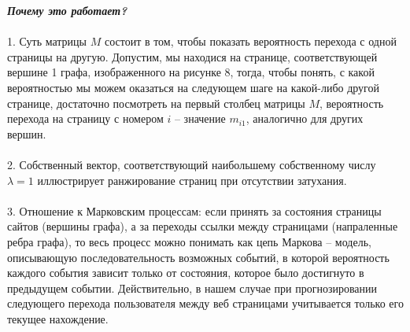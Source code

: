 \documentclass[a5paper, 10pt]{article}
\theoremstyle{definition}
\theoremstyle{plain}
\theoremstyle{remark}
\begin{document}
\newpage
\textbf{\textit{Почему это работает?}}\\
\\
1. Суть матрицы $M$ состоит в том, чтобы показать вероятность перехода с одной страницы на другую. Допустим, мы находися на странице, соответствующей вершине 1 графа, изображенного на рисунке 8, тогда, чтобы понять, с какой вероятностью мы можем оказаться на следующем шаге на какой-либо другой странице, достаточно посмотреть на первый столбец матрицы $M$, вероятность перехода на страницу с номером $i$ -- значение $m_{i1}$, аналогично для других вершин.\\
\\
2. Собственный вектор, соответствующий наибольшему собственному числу $\lambda = 1$ иллюстрирует ранжирование страниц при отсутствии затухания.
\\
\\
3. Отношение к Марковским процессам: если принять за состояния страницы сайтов (вершины графа), а за переходы ссылки между страницами (напраленные ребра графа), то весь процесс можно понимать как цепь Маркова -- модель, описывающую последовательность возможных событий, в которой вероятность каждого события зависит только от состояния, которое было достигнуто в предыдущем событии. Действительно, в нашем случае при прогнозировании следующего перехода пользователя между веб страницами учитывается только его текущее нахождение.



\newpage
\end{document}
